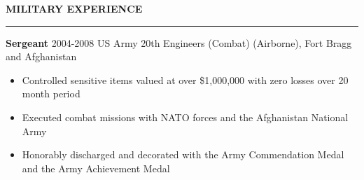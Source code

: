 \documentclass{article}
\begin{document}
\textbf{MILITARY EXPERIENCE}

\vspace{0.2 cm}
\hrule
\vspace{0.1cm}

\begin{description}

\item \textbf{Sergeant}
    \hspace{.5cm}
    2004-2008 US Army 20th Engineers (Combat) (Airborne), Fort Bragg and Afghanistan

\begin{itemize}
\item Controlled sensitive items valued at over \$1,000,000 with zero losses over 20 month period

\item Executed combat missions with NATO forces and the Afghanistan National Army

\item Honorably discharged and decorated with the Army Commendation Medal and the Army Achievement Medal
\end{itemize}

\end{description}
\end{document}
